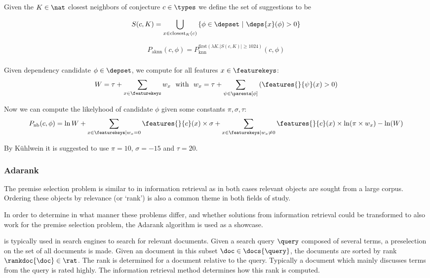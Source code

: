 \begin{definition}
  Given the $K \in \nat$ closest neighbors of conjecture $c \in \types$ we define the set of suggestions to be

  $$
    S(c, K) = \bigcup_{x \in \text{closest}_K(c)} \left\{ \phi \in \depset ~|~ \deps{x}(\phi) > 0 \right\}
  $$
\end{definition}

\begin{definition}
  $$
    P_\text{aknn}(c, \phi) = P^{\text{first}(\lambda K . |S(c, K)| \geq 1024)}_\text{knn}(c, \phi)
  $$
\end{definition}

\subsubsection{\nb}

Given dependency candidate $\phi \in \depset$, we compute for all features $x \in \featurekeys$:
\[
  W = \tau + \sum_{x \in \featurekeys} w_x ~~\text{with}~~ w_x = \tau + \sum_{\psi \in \parents[\phi]} \left( \features{}{\psi}(x) > 0 \right)
\]

Now we can compute the likelyhood of candidate $\phi$ given some constants $\pi, \sigma, \tau$:
\[
	P_\text{nb}(c, \phi) = \ln W +
  \sum_{x \in \featurekeys | w_x = 0} \features{}{c}(x) \times \sigma +
  \sum_{x \in \featurekeys | w_x \neq 0} \features{}{c}(x) \times \ln(\pi \times w_x) - \ln(W)
\]

By K\"uhlwein \cite{kuhlwein2013mash} it is suggested to use $\pi = 10$, $\sigma = -15$ and $\tau = 20$.

\subsubsection{Adarank}
The premise selection problem is similar to \ltr in information retrieval
as in both cases relevant objects are sought from a large corpus.
Ordering these objects by relevance (or `rank') is also a common theme in both fields of study.

In order to determine in what manner these problems differ, and whether solutions
from information retrieval could be transformed to also work for the premise selection problem,
the Adarank algorithm \cite{xu2007adarank} is used as a showcase.

\ltr is typically used in search engines to search for relevant documents.
Given a search query $\query$ composed of several terms, a preselection on the set of
all documents is made. Given an document in this subset $\doc \in \docs{\query}$,
the documents are sorted by rank $\rankdoc{\doc} \in \rat$.
The rank is determined for a document relative to the query.
Typically a document which mainly discusses terms from the query is rated highly.
The information retrieval method determines how this rank is computed.

